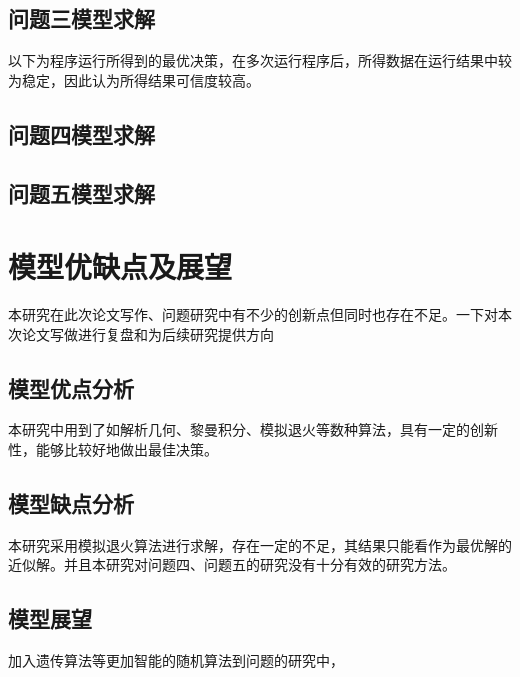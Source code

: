 \documentclass{article}
\begin{document}
\subsection{问题三模型求解}
以下为程序运行所得到的最优决策，在多次运行程序后，所得数据在运行结果中较为稳定，因此认为所得结果可信度较高。

\subsection{问题四模型求解}

\subsection{问题五模型求解}

\section{模型优缺点及展望}
本研究在此次论文写作、问题研究中有不少的创新点但同时也存在不足。一下对本次论文写做进行复盘和为后续研究提供方向

\subsection{模型优点分析}

本研究中用到了如解析几何、黎曼积分、模拟退火等数种算法，具有一定的创新性，能够比较好地做出最佳决策。

\subsection{模型缺点分析}
本研究采用模拟退火算法进行求解，存在一定的不足，其结果只能看作为最优解的近似解。并且本研究对问题四、问题五的研究没有十分有效的研究方法。

\subsection{模型展望}
加入遗传算法等更加智能的随机算法到问题的研究中，
\end{document}
